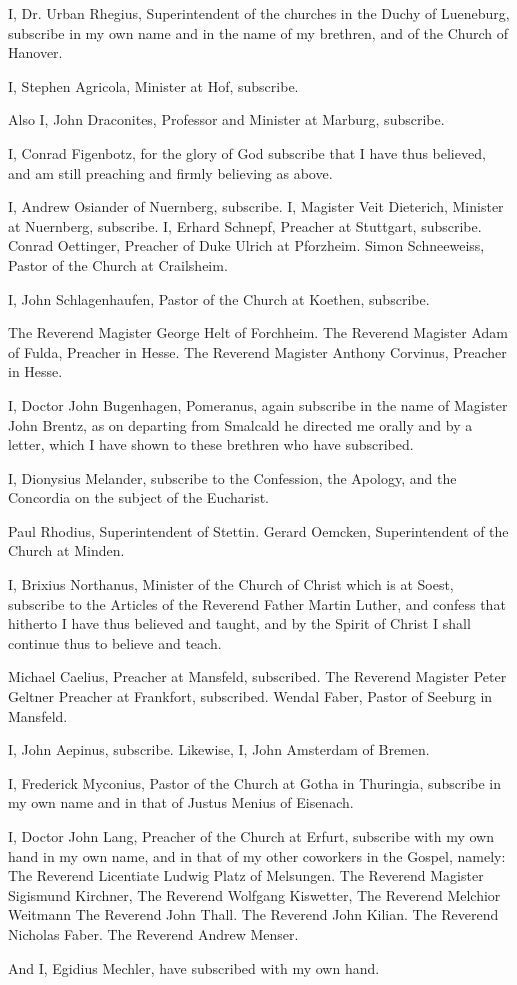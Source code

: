      I, Dr. Urban Rhegius, Superintendent of the churches in the
     Duchy of Lueneburg, subscribe in my own name and in the name
     of my brethren, and of the Church of Hanover.

     I, Stephen Agricola, Minister at Hof, subscribe.

     Also I, John Draconites, Professor and Minister at Marburg,
     subscribe.

     I, Conrad Figenbotz, for the glory of God subscribe that I
     have thus believed, and am still preaching and firmly
     believing as above.

     I, Andrew Osiander of Nuernberg, subscribe.
     I, Magister Veit Dieterich, Minister at Nuernberg, subscribe.
     I, Erhard Schnepf, Preacher at Stuttgart, subscribe.
     Conrad Oettinger, Preacher of Duke Ulrich at Pforzheim.
     Simon Schneeweiss, Pastor of the Church at Crailsheim.

     I, John Schlagenhaufen, Pastor of the Church at Koethen,
     subscribe.

     The Reverend Magister George Helt of Forchheim.
     The Reverend Magister Adam of Fulda, Preacher in Hesse.
     The Reverend Magister Anthony Corvinus, Preacher in Hesse.

     I, Doctor John Bugenhagen, Pomeranus, again subscribe in the
     name of Magister John Brentz, as on departing from Smalcald he
     directed me orally and by a letter, which I have shown to
     these brethren who have subscribed.

     I, Dionysius Melander, subscribe to the Confession, the
     Apology, and the Concordia on the subject of the Eucharist.

     Paul Rhodius, Superintendent of Stettin.
     Gerard Oemcken, Superintendent of the Church at Minden.

     I, Brixius Northanus, Minister of the Church of Christ which
     is at Soest, subscribe to the Articles of the Reverend Father
     Martin Luther, and confess that hitherto I have thus believed
     and taught, and by the Spirit of Christ I shall continue thus
     to believe and teach.

     Michael Caelius, Preacher at Mansfeld, subscribed.
     The Reverend Magister Peter Geltner Preacher at Frankfort,
     subscribed.
     Wendal Faber, Pastor of Seeburg in Mansfeld.

     I, John Aepinus, subscribe.
     Likewise, I, John Amsterdam of Bremen.

     I, Frederick Myconius, Pastor of the Church at Gotha in
     Thuringia, subscribe in my own name and in that of Justus
     Menius of Eisenach.

     I, Doctor John Lang, Preacher of the Church at Erfurt,
     subscribe with my own hand in my own name, and in that of my
     other coworkers in the Gospel, namely:
     The Reverend Licentiate Ludwig Platz of Melsungen.
     The Reverend Magister Sigismund Kirchner,
     The Reverend Wolfgang Kiswetter,
     The Reverend Melchior Weitmann
     The Reverend John Thall.
     The Reverend John Kilian.
     The Reverend Nicholas Faber.
     The Reverend Andrew Menser.

     And I, Egidius Mechler, have subscribed with my own hand.
